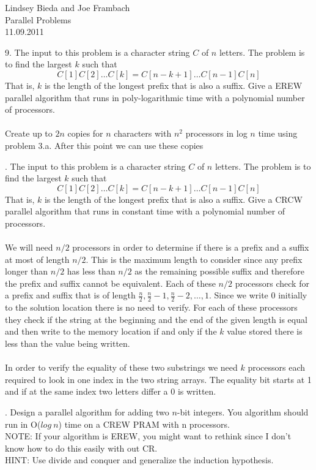 \documentclass[10pt]{article}
\begin{document}
	\begin{flushright}
	Lindsey Bieda and Joe Frambach\\
	Parallel Problems\\
	11.09.2011
	\end{flushright}

9. The input to this problem is a character string $C$ of $n$ letters. The problem is to find the largest $k$
such that
\[C[1]C[2] \ldots C[k] = C[n - k + 1] \ldots C[n - 1]C[n]\]
That is, $k$ is the length of the longest prefix that is also a suffix. Give a EREW parallel algorithm that
runs in poly-logarithmic time with a polynomial number of processors.\\
\\
Create up to $2n$ copies for $n$ characters with $n^2$ processors in log $n$ time using problem 3.a. After this
point we can use these copies 


. The input to this problem is a character string $C$ of $n$ letters. The problem is to find the largest $k$
such that
\[C[1]C[2] \ldots C[k] = C[n - k + 1] \ldots C[n - 1]C[n]\]
That is, $k$ is the length of the longest prefix that is also a suffix. Give a CRCW parallel algorithm that
runs in constant time with a polynomial number of processors.\\
\\
We will need $n/2$ processors in order to determine if there is a prefix and a suffix at most of length $n/2$.
This is the maximum length to consider since any prefix longer than $n/2$ has less than $n/2$ as the remaining 
possible suffix and therefore the prefix and suffix cannot be equivalent. Each of these $n/2$ processors check
for a prefix and suffix that is of length $\frac{n}{2}, \frac{n}{2} - 1, \frac{n}{2} - 2, \ldots, 1$. Since we write
0 initially to the solution location there is no need to verify. For each of these processors they check if the string 
at the beginning and the end of the given length is equal and then write to the memory location if and only if the $k$
value stored there is less than the value being written.\\
\\
In order to verify the equality of these two substrings we need $k$ processors each required to look in one index in the two
string arrays. The equality bit starts at 1 and if at the same index two letters differ a 0 is written. 

. Design a parallel algorithm for adding two $n$-bit integers. You algorithm should run in O($log~n$) time
on a CREW PRAM with n processors.\\
NOTE: If your algorithm is EREW, you might want to rethink since I don't know how to do this easily
with out CR.\\
HINT: Use divide and conquer and generalize the induction hypothesis.
\end{document}
